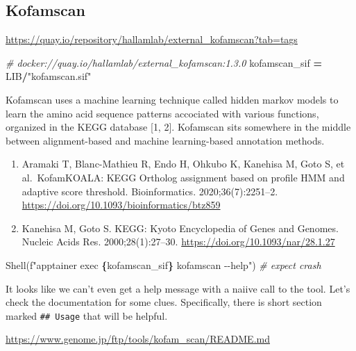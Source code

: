 \documentclass[
]{book}
\newenvironment{Shaded}{\begin{snugshade}}{\end{snugshade}}
\newcommand{\CommentTok}[1]{\textcolor[rgb]{0.56,0.35,0.01}{\textit{#1}}}
\newcommand{\NormalTok}[1]{#1}
\newcommand{\OperatorTok}[1]{\textcolor[rgb]{0.81,0.36,0.00}{\textbf{#1}}}
\newcommand{\SpecialCharTok}[1]{\textcolor[rgb]{0.81,0.36,0.00}{\textbf{#1}}}
\newcommand{\SpecialStringTok}[1]{\textcolor[rgb]{0.31,0.60,0.02}{#1}}
\newcommand{\StringTok}[1]{\textcolor[rgb]{0.31,0.60,0.02}{#1}}
\providecommand{\tightlist}{%
  \setlength{\itemsep}{0pt}\setlength{\parskip}{0pt}}
\begin{document}
\subsection{Kofamscan}\label{kofamscan}

\url{https://quay.io/repository/hallamlab/external_kofamscan?tab=tags}

\begin{Shaded}
\begin{Highlighting}[numbers=left,,]
\CommentTok{\# docker://quay.io/hallamlab/external\_kofamscan:1.3.0}
\NormalTok{kofamscan\_sif }\OperatorTok{=}\NormalTok{ LIB}\OperatorTok{/}\StringTok{"kofamscan.sif"}
\end{Highlighting}
\end{Shaded}

Kofamscan uses a machine learning technique called hidden markov models to learn the amino acid sequence patterns
accociated with various functions, organized in the KEGG database {[}1, 2{]}. Kofamscan sits somewhere in the middle
between alignment-based and machine learning-based annotation methods.

\begin{enumerate}
\def\labelenumi{\arabic{enumi}.}
\tightlist
\item
  Aramaki T, Blanc-Mathieu R, Endo H, Ohkubo K, Kanehisa M, Goto S, et al.~KofamKOALA: KEGG Ortholog assignment based on profile HMM and adaptive score threshold. Bioinformatics. 2020;36(7):2251--2. \url{https://doi.org/10.1093/bioinformatics/btz859}
\item
  Kanehisa M, Goto S. KEGG: Kyoto Encyclopedia of Genes and Genomes. Nucleic Acids Res. 2000;28(1):27--30. \url{https://doi.org/10.1093/nar/28.1.27}
\end{enumerate}

\begin{Shaded}
\begin{Highlighting}[numbers=left,,]
\NormalTok{Shell(}\SpecialStringTok{f"apptainer exec }\SpecialCharTok{\{}\NormalTok{kofamscan\_sif}\SpecialCharTok{\}}\SpecialStringTok{ kofamscan {-}{-}help"}\NormalTok{) }\CommentTok{\# expect crash}
\end{Highlighting}
\end{Shaded}

It looks like we can't even get a help message with a naiive call to the tool.
Let's check the documentation for some clues. Specifically, there is short section marked \texttt{\#\#\ Usage} that will be helpful.

\url{https://www.genome.jp/ftp/tools/kofam_scan/README.md}
\end{document}

